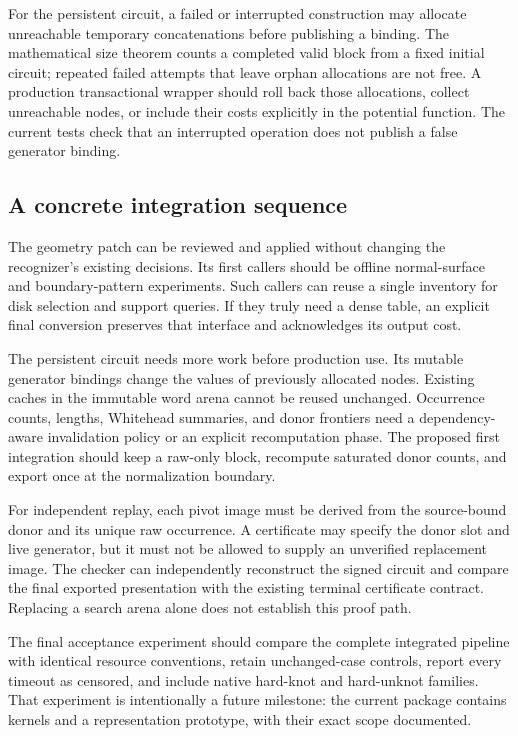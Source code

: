 \documentclass[11pt,a4paper]{article}
\theoremstyle{definition}
\theoremstyle{remark}
\begin{document}
For the persistent circuit, a failed or interrupted construction may
allocate unreachable temporary concatenations before publishing a binding.
The mathematical size theorem counts a completed valid block from a fixed
initial circuit; repeated failed attempts that leave orphan allocations
are not free. A production transactional wrapper should roll back those
allocations, collect unreachable nodes, or include their costs explicitly
in the potential function. The current tests check that an interrupted
operation does not publish a false generator binding.

\subsection{A concrete integration sequence}

The geometry patch can be reviewed and applied without changing the
recognizer's existing decisions. Its first callers should be offline
normal-surface and boundary-pattern experiments. Such callers can reuse a
single inventory for disk selection and support queries. If they truly
need a dense table, an explicit final conversion preserves that interface
and acknowledges its output cost.

The persistent circuit needs more work before production use. Its mutable
generator bindings change the values of previously allocated nodes.
Existing caches in the immutable word arena cannot be reused unchanged.
Occurrence counts, lengths, Whitehead summaries, and donor frontiers need
a dependency-aware invalidation policy or an explicit recomputation phase.
The proposed first integration should keep a raw-only block, recompute
saturated donor counts, and export once at the normalization boundary.

For independent replay, each pivot image must be derived from the
source-bound donor and its unique raw occurrence. A certificate may specify
the donor slot and live generator, but it must not be allowed to supply an
unverified replacement image. The checker can independently reconstruct
the signed circuit and compare the final exported presentation with the
existing terminal certificate contract. Replacing a search arena alone
does not establish this proof path.

The final acceptance experiment should compare the complete integrated
pipeline with identical resource conventions, retain unchanged-case
controls, report every timeout as censored, and include native hard-knot
and hard-unknot families. That experiment is intentionally a future
milestone: the current package contains kernels and a representation
prototype, with their exact scope documented.
\end{document}
